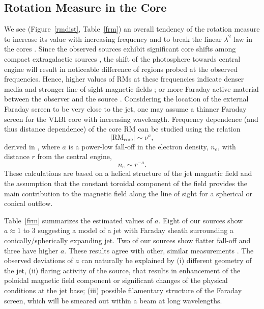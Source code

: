 \documentclass[a4paper,fleqn,usenatbib,useAMS]{mnras}
\begin{document}
\subsection{Rotation Measure in the Core}
\label{s:rm-core}

We see (Figure~\ref{rmdist}, Table~\ref{frm}) an overall tendency of the rotation measure to increase its value with increasing frequency and to break the linear $\lambda^2$ law in the cores \citep[see also VLA results by][]{kravchenko_etal15}. 
Since the observed sources exhibit significant core shifts among compact extragalactic sources \citep{sokolovsky_etal11,kovalev_etal08}, the shift of the photosphere towards central engine will result in noticeable difference of regions probed at the observed frequencies.
Hence, higher values of RMs at these frequencies indicate denser media and stronger line-of-sight magnetic fields \citep{lobanov98,kovalev_etal08,sokolovsky_etal11,2011ApJ...737...42P,pushkarev_etal12}; or more Faraday active material between the observer and the source \citep{2011ApJ...737...42P}. 
Considering the location of the external Faraday screen to be very close to the jet, one may assume a thinner Faraday screen for the VLBI core with increasing wavelength. 
Frequency dependence (and thus distance dependence) of the core RM can be studied using the relation 
\begin{equation}|\mathrm{RM}_\mathrm{core}|\sim{\nu}^{a},\end{equation}
derived in \citet{jorstad_etal07}, where $a$ is a power-low fall-off in the electron density, $n_e$, with distance $r$ from the central engine, \begin{equation}n_e\sim r^{-a}.\end{equation}
These calculations are based on a helical structure of the jet magnetic field and the assumption that the constant toroidal component of the field provides the main contribution to the magnetic field along the line of sight for a spherical or conical outflow.

Table~\ref{frm} summarizes the estimated values of $a$.
Eight of our sources show $a\approx1$ to 3 suggesting a model of a jet with Faraday sheath surrounding a conically/spherically expanding jet. Two of our sources show flatter fall-off and three have higher $a$. These results agree with other, similar measurements  \citep{jorstad_etal07,osullivan_gabuzda_09,trippe_etal12}.
The observed deviations of $a$ can naturally be explained by (i) different geometry of the jet, (ii) flaring activity of the source, that results in enhancement of the poloidal magnetic field component or significant changes of the physical conditions at the jet base; (iii) possible filamentary structure of the Faraday screen, which will be smeared out within a beam at long wavelengths.
\end{document}
